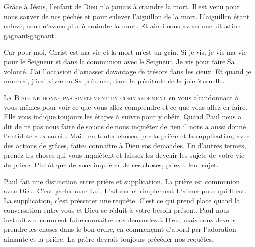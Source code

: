 Grâce à Jésus, l'enfant de Dieu n'a jamais à craindre la mort.
 Il est venu pour nous sauver de nos péchés et pour enlever l'aiguillon
 de la mort. L'aiguillon étant enlevé, nous n'avons plus à craindre la mort.
 Et ainsi nous avons une situation gagnant-gagnant.

\og Car pour moi, Christ est ma vie et la mort m'est un gain. \fg{}
 Si je vis, je vis ma vie pour le Seigneur et dans la communion
 avec le Seigneur. Je vis pour faire Sa volonté.
 J'ai l'occasion d'amasser davantage de trésors dans les cieux.
 Et quand je mourrai, j'irai vivre en Sa présence,
 dans la plénitude de la joie éternelle.

\dvrule







\lettrine{L}{a Bible ne donne pas simplement un commandement}
 en vous abandonnant à vous-mêmes pour voir ce que vous allez comprendre
 et ce que vous allez en faire. Elle vous indique toujours les étapes
 à suivre pour y obéir. Quand Paul nous a dit de ne pas nous faire de soucis
 \ocadr de nous \og inquiéter de rien \fg{} \fcadr{}
 il nous a aussi donné l'antidote aux soucis.
 \og Mais, en toutes choses, par la prière et la supplication,
 avec des actions de grâces, faites connaître à Dieu vos demandes. \fg{}
 En d'autres termes, prenez les choses qui vous inquiètent
 et laissez les devenir les sujets de votre vie de prière.
 Plutôt que de vous inquiéter 
 de ces choses, priez à leur sujet.


Paul fait une distinction entre prière et supplication.
 La prière est communion avec Dieu. C'est parler avec Lui, L'adorer
 et simplement L'aimer pour qui Il est. La supplication, 
 c'est présenter une requête.
 C'est ce qui prend place quand la conversation entre vous et Dieu se réduit
 à votre besoin présent. Paul nous instruit sur comment 
 faire connaître nos demandes à Dieu, mais nous devons prendre les choses
 dans le bon ordre, en commençant d'abord par l'adoration aimante et la prière.
 La prière devrait toujours précéder nos requêtes.

